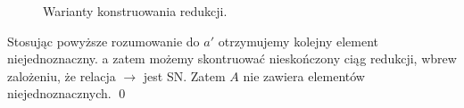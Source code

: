 \begin{dowod}
\begin{enumerate}[label={\roman*)}, ref={\roman*)}]
\begin{center}
\begin{minipage}{0.75\linewidth}
\begin{figure}[H]
          \hspace{4em}
          \hfill
          \caption{Warianty konstruowania redukcji.} 
        \end{figure}
      \end{minipage}
    \end{center}
  \end{enumerate}
  Stosując powyższe rozumowanie do \(a'\) otrzymujemy kolejny element niejednoznaczny. a zatem możemy skontruować nieskończony ciąg redukcji, wbrew zalożeniu, że relacja \(\to\) jest SN. Zatem \(A\) nie zawiera elementów niejednoznacznych. \qed
\end{dowod}
